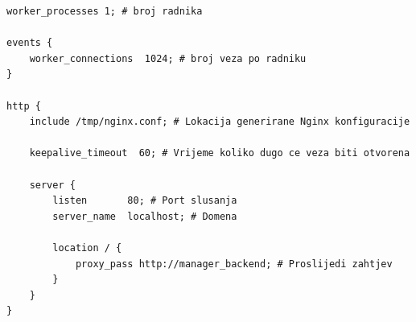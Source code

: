 \begin{lstlisting}[float=h]
worker_processes 1; # broj radnika

events {
    worker_connections  1024; # broj veza po radniku
}

http {
    include /tmp/nginx.conf; # Lokacija generirane Nginx konfiguracije

    keepalive_timeout  60; # Vrijeme koliko dugo ce veza biti otvorena

    server {
        listen       80; # Port slusanja
        server_name  localhost; # Domena

        location / {
            proxy_pass http://manager_backend; # Proslijedi zahtjev
        }
    }
}
\end{lstlisting}
